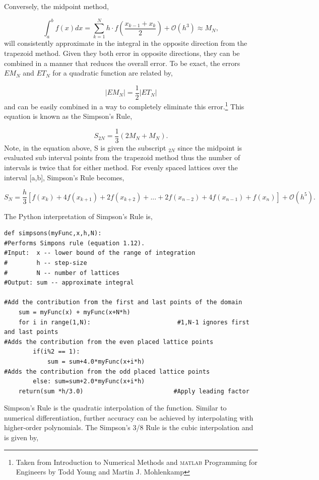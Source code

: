 \documentclass[10pt]{article}
\begin{document}
Conversely, the midpoint method,

\begin{equation}
	\label{eq:midpoint}
	\int^b_a f(x)dx = \sum^N_{k=1} h\cdot f\left(\frac{x_{k-1}+x_k}{2}\right) + \mathcal{O}(h^3) \approx M_N,
\end{equation}
will consistently approximate in the integral in the opposite direction from the trapezoid method. Given they both error in opposite directions, they can be combined in a manner that reduces the overall error. To be exact, the errors $EM_N$ and $ET_N$ for a quadratic function are related by,

\[
	|EM_N| = \frac{1}{2}|ET_N|
\]
and can be easily combined in a way to completely eliminate this error.\footnote{Taken from Introduction to Numerical Methods and \textsc{matlab} Programming for Engineers by Todd Young and Martin J. Mohlenkamp} This equation is known as the Simpson's Rule,

\[
	S_{2N} = \frac{1}{3}(2M_N + M_N).
\]
Note, in the equation above, S is given the subscript $_{2N}$ since the midpoint is evaluated sub interval points from the trapezoid method thus the number of intervals is twice that for either method. For evenly spaced lattices over the interval [a,b], Simpson's Rule becomes,

\begin{equation}
	\label{eq:simpson}
	S_N = \frac{h}{3}[f(x_k)+4f(x_{k+1})+2f(x_{k+2})+...+2f(x_{n-2})+4f(x_{n-1})+f(x_n)] + \mathcal{O}(h^5).
\end{equation}

The Python interpretation of Simpson's Rule is,
\begin{lstlisting}
def simpsons(myFunc,x,h,N):
#Performs Simpons rule (equation 1.12).
#Input:  x -- lower bound of the range of integration
#        h -- step-size
#        N -- number of lattices
#Output: sum -- approximate integral

#Add the contribution from the first and last points of the domain
    sum = myFunc(x) + myFunc(x+N*h)
    for i in range(1,N):                        #1,N-1 ignores first and last points
#Adds the contribution from the even placed lattice points
        if(i%2 == 1):
            sum = sum+4.0*myFunc(x+i*h)
#Adds the contribution from the odd placed lattice points
        else: sum=sum+2.0*myFunc(x+i*h)
    return(sum *h/3.0)                         #Apply leading factor
\end{lstlisting}

Simpson's Rule is the quadratic interpolation of the function. Similar to numerical differentiation, further accuracy can be achieved by interpolating with higher-order polynomials. The Simpson's 3/8 Rule is the cubic interpolation and is given by,
\end{document}
